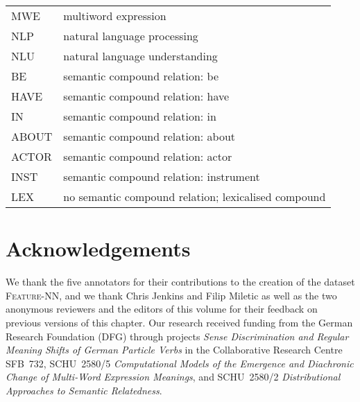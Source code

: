 \documentclass[output=paper,colorlinks,citecolor=brown]{langscibook}
\begin{document}
\begin{tabularx}{.9\textwidth}{@{}lQ@{}}
MWE & multiword expression\\
NLP & natural language processing\\
NLU & natural language understanding\\
BE & semantic compound relation: be\\
HAVE & semantic compound relation: have\\
IN & semantic compound relation: in\\
ABOUT & semantic compound relation: about\\
ACTOR & semantic compound relation: actor\\
INST & semantic compound relation: instrument\\
LEX & no semantic compound relation; lexicalised compound\\
\end{tabularx}


\section*{Acknowledgements}

We thank the five annotators for their contributions to the creation of the dataset \textsc{Feature-NN}, and we thank Chris Jenkins and Filip Miletic as well as the two anonymous reviewers and the editors of this volume for their feedback on previous versions of this chapter. Our research received funding from the German Research Foundation (DFG) through projects \textit{Sense Discrimination and Regular Meaning Shifts of German Particle Verbs} in the Collaborative Research Centre SFB~732, SCHU~2580/5 \textit{Computational Models of the Emergence and Diachronic Change of Multi-Word Expression Meanings}, and SCHU~2580/2 \textit{Distributional Approaches to Semantic Relatedness}.
\end{document}
